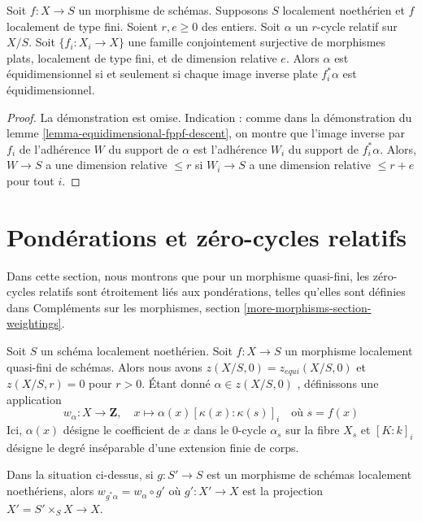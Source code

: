 \begin{lemma} 
\label{lemma-equidimensional-descent-pullbacks} 
Soit  $f : X \to S$  un morphisme de schémas. Supposons  $S$  localement noethérien
 et  $f$  localement de type fini. Soient  $r, e \geq 0$  des entiers. 
Soit  $\alpha$  un  $r$-cycle relatif sur  $X/S$.
 Soit $\{f_i : X_i \to X\}$  une famille conjointement surjective
 de morphismes plats, localement de type fini, et de dimension relative  $e$. 
Alors  $\alpha$  est équidimensionnel si et seulement si chaque image 
inverse plate  $f_i^*\alpha$  est équidimensionnel. 
\end{lemma} 

\begin{proof} La 
démonstration est omise. Indication : comme dans la démonstration du lemme \ref{lemma-equidimensional-fppf-descent},
 on montre que l'image inverse par  $f_i$  de l'adhérence  $W$  du support de  
$\alpha$  est l'adhérence  $W_i$  du support de  $f_i^*\alpha$. Alors, 
$W \to S$  a une dimension relative  $\leq r$  si  $W_i \to S$
  a une dimension relative  $\leq r + e$  pour tout  $i$. 
\end{proof} 





\section{Pondérations et zéro-cycles relatifs} 
\label{section-weightings} 

\noindent
 Dans cette section, nous montrons que pour un morphisme quasi-fini, les 
zéro-cycles relatifs sont étroitement liés aux pondérations, telles qu'elles sont définies dans 
Compléments sur les morphismes, section \ref{more-morphisms-section-weightings}. 

\medskip\noindent
 Soit  $S$  un schéma localement noethérien. Soit  $f : X \to S$  un morphisme 
localement quasi-fini de schémas. Alors nous avons  $z(X/S, 0) = z_{equi}(X/S, 0)$
  et  $z(X/S, r) = 0$ pour  $r > 0$. Étant donné  $\alpha \in z(X/S, 0)$ , définissons
 une application 
$$
w_\alpha : X \longrightarrow \mathbf{Z},\quad
x \mapsto \alpha(x) [\kappa(x) : \kappa(s)]_i \quad\text{où }s = f(x)
$$
 Ici,  $\alpha(x)$  désigne le coefficient de  $x$  dans le $0$-cycle  
$\alpha_s$  sur la fibre  $X_s$  et  $[K : k]_i$  désigne le degré inséparable
 d'une extension finie de corps. 

\begin{lemma} 
\label{lemma-weightings-pre} 
Dans la situation ci-dessus, si  $g : S' \to S$  est un morphisme de schémas 
localement noethériens, alors  $w_{g^*\alpha} = w_\alpha \circ g'$  où  
$g' : X' \to X$  est la projection $X' = S' \times_S X \to X$. 
\end{lemma} 

